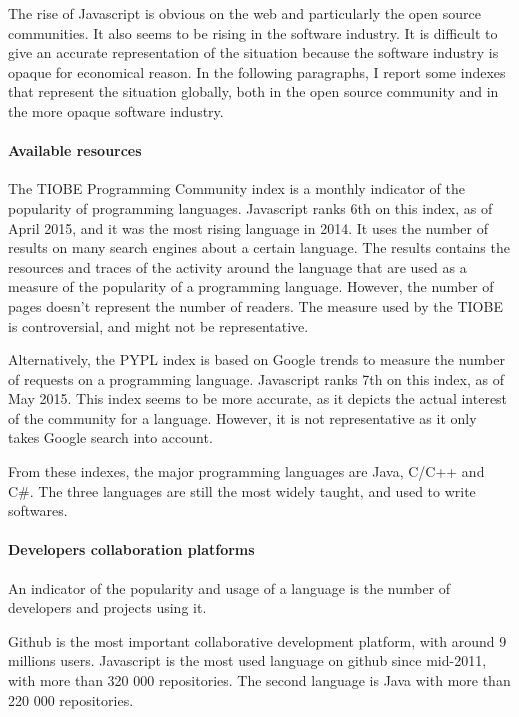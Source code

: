 The rise of Javascript is obvious on the web and particularly the open source communities.
It also seems to be rising in the software industry.
It is difficult to give an accurate representation of the situation because the software industry is opaque for economical reason.
In the following paragraphs, I report some indexes that represent the situation globally, both in the open source community and in the more opaque software industry.

\paragraph{Available resources}

The TIOBE Programming Community index is a monthly indicator of the popularity of programming languages.
Javascript ranks 6th on this index, as of April 2015, and it was the most rising language in 2014.
It uses the number of results on many search engines about a certain language.
The results contains the resources and traces of the activity around the language that are used as a measure of the popularity of a programming language.
However, the number of pages doesn't represent the number of readers.
The measure used by the TIOBE is controversial, and might not be representative.

Alternatively, the PYPL index is based on Google trends to measure the number of requests on a programming language.
Javascript ranks 7th on this index, as of May 2015.
This index seems to be more accurate, as it depicts the actual interest of the community for a language.
However, it is not representative as it only takes Google search into account.

From these indexes, the major programming languages are Java, C/C++ and C\#.
The three languages are still the most widely taught, and used to write softwares.

\paragraph{Developers collaboration platforms}

An indicator of the popularity and usage of a language is the number of developers and projects using it.

Github is the most important collaborative development platform, with around 9 millions users.
Javascript is the most used language on github since mid-2011, with more than 320 000 repositories.
The second language is Java with more than 220 000 repositories.

